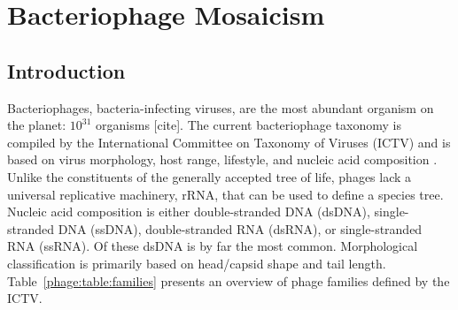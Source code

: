 \chapter{Bacteriophage Mosaicism}
\label{ch:phage}

\section{Introduction}
\label{phage:sec:introduction}

Bacteriophages, bacteria-infecting viruses, are the most abundant organism on the planet: $10^31$ organisms [cite].
The current bacteriophage taxonomy is compiled by the International Committee on Taxonomy of Viruses (ICTV) and is based on virus morphology, host range, lifestyle, and nucleic acid composition \cite{ICTV:2012}.
Unlike the constituents of the generally accepted tree of life, phages lack a universal replicative machinery, rRNA, that can be used to define a species tree.
Nucleic acid composition is either double-stranded DNA (dsDNA), single-stranded DNA (ssDNA), double-stranded RNA (dsRNA), or single-stranded RNA (ssRNA).
Of these dsDNA is by far the most common.
Morphological classification is primarily based on head/capsid shape and tail length.
Table~\ref{phage:table:families} presents an overview of phage families defined by the ICTV.

